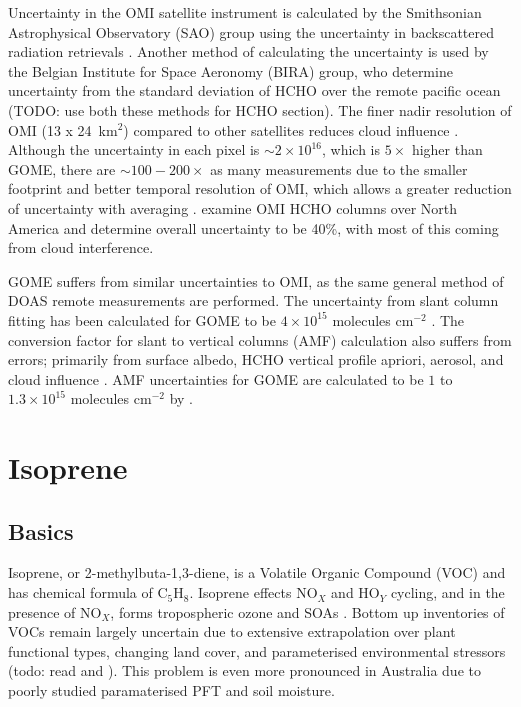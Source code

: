     Uncertainty in the OMI satellite instrument is calculated by the Smithsonian Astrophysical Observatory (SAO) group using the uncertainty in backscattered radiation retrievals \citep{Abad2015, Abad2016}.
    Another method of calculating the uncertainty is used by the Belgian Institute for Space Aeronomy (BIRA) group, who determine uncertainty from the standard deviation of HCHO over the remote pacific ocean (TODO: use both these methods for HCHO section)\citep{DeSmedt2012, DeSmedt2015}.
    The finer nadir resolution of OMI (13 x 24~km${^2}$) compared to other satellites reduces cloud influence \citep{Millet2006,Millet2008}. 
    Although the uncertainty in each pixel is $\sim 2 \times 10^{16}$, which is $5 \times$ higher than GOME, there are $\sim 100-200 \times $ as many measurements due to the smaller footprint and better temporal resolution of OMI, which allows a greater reduction of uncertainty with averaging \citep{Chance2002,Millet2008}.
    \cite{Millet2006} examine OMI HCHO columns over North America and determine overall uncertainty to be 40\%, with most of this coming from cloud interference.
    
    GOME suffers from similar uncertainties to OMI, as the same general method of DOAS remote measurements are performed.
    The uncertainty from slant column fitting has been calculated for GOME to be $4\times10^{15}$ molecules cm$^{-2}$ \citep{Chance2000, Millet2006}. 
    The conversion factor for slant to vertical columns (AMF) calculation also suffers from errors; primarily from surface albedo, HCHO vertical profile apriori, aerosol, and cloud influence \citep{Millet2006}. 
    AMF uncertainties for GOME are calculated to be $1$ to $1.3\times10^{15}$ molecules cm$^{-2}$ by \citet{Shim2005}.
\section{Isoprene}
\label{ch_LitRev:sec:isoprene}

  \subsection{Basics}
    Isoprene, or 2-methylbuta-1,3-diene, is a Volatile Organic Compound (VOC) and has chemical formula of C$_5$H$_8$. 
    Isoprene effects NO$_X$ and HO$_Y$ cycling, and in the presence of NO$_X$, forms tropospheric ozone and SOAs \citep{Wagner2002, Millet2006}.
    Bottom up inventories of VOCs remain largely uncertain due to extensive extrapolation over plant functional types, changing land cover, and parameterised environmental stressors (todo: read and \citep{Guenther2000}).
    This problem is even more pronounced in Australia due to poorly studied paramaterised PFT and soil moisture.

